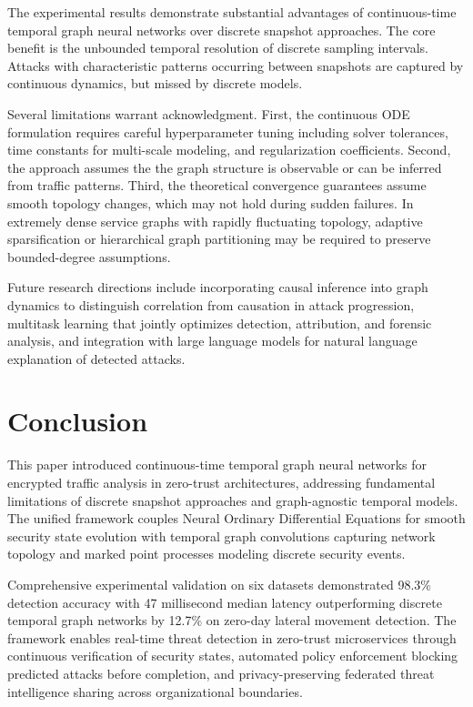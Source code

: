 \documentclass[lettersize,journal]{IEEEtran}
\begin{document}
The experimental results demonstrate substantial advantages of continuous-time temporal graph neural networks over discrete snapshot approaches. The core benefit is the unbounded temporal resolution of discrete sampling intervals. Attacks with characteristic patterns occurring between snapshots are captured by continuous dynamics, but missed by discrete models.

Several limitations warrant acknowledgment. First, the continuous ODE formulation requires careful hyperparameter tuning including solver tolerances, time constants for multi-scale modeling, and regularization coefficients. Second, the approach assumes the the graph structure is observable or can be inferred from traffic patterns. Third, the theoretical convergence guarantees assume smooth topology changes, which may not hold during sudden failures. In extremely dense service graphs with rapidly fluctuating topology, adaptive sparsification or hierarchical graph partitioning may be required to preserve bounded-degree assumptions.

Future research directions include incorporating causal inference into graph dynamics to distinguish correlation from causation in attack progression, multitask learning that jointly optimizes detection, attribution, and forensic analysis, and integration with large language models for natural language explanation of detected attacks.

\section{Conclusion}
\label{sec:conclusion}

This paper introduced continuous-time temporal graph neural networks for encrypted traffic analysis in zero-trust architectures, addressing fundamental limitations of discrete snapshot approaches and graph-agnostic temporal models. The unified framework couples Neural Ordinary Differential Equations for smooth security state evolution with temporal graph convolutions capturing network topology and marked point processes modeling discrete security events.

Comprehensive experimental validation on six datasets demonstrated 98.3\% detection accuracy with 47 millisecond median latency outperforming discrete temporal graph networks by 12.7\% on zero-day lateral movement detection. The framework enables real-time threat detection in zero-trust microservices through continuous verification of security states, automated policy enforcement blocking predicted attacks before completion, and privacy-preserving federated threat intelligence sharing across organizational boundaries.
\end{document}
